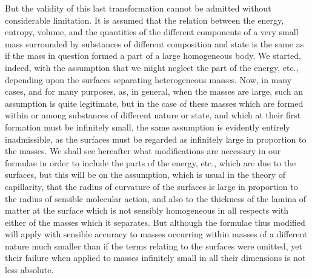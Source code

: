 \documentclass[11pt]{article}
\begin{document}
But the validity of this last transformation cannot be admitted without considerable limitation. It is assumed that the relation between the energy, entropy, volume, and the quantities of the different components of a very small mass surrounded by substances of different composition and state is the same as if the mass in
question formed a part of a large homogeneous body. We started, indeed, with the assumption that we might neglect the part of the energy, etc., depending upon the surfaces separating heterogeneous masses. Now, in many cases, and for many purposes, as, in general, when the masses are large, such an assumption is quite legitimate, but in the case of these masses which are formed within or among substances of different nature or state, and which at their first formation must be infinitely small, the same assumption is evidently entirely inadmissible, as the surfaces must be regarded as infinitely large in proportion to the masses. We shall see hereafter what modifications are necessary in our formulae in order to include the parts of the energy, etc., which are due to the surfaces, but this will be on the assumption, which is usual in the theory of capillarity, that the radius of curvature of the surfaces is large in proportion to the radius of sensible molecular action, and also to the thickness of the lamina of matter at the surface which is not sensibly homogeneous in all respects with either of the masses which it separates. But although the formulae thus modified will apply with sensible accuracy to masses occurring within masses of a different nature much smaller than if the terms relating to the surfaces were omitted, yet their failure when applied to masses infinitely small in all their dimensions is not less absolute.
\end{document}
